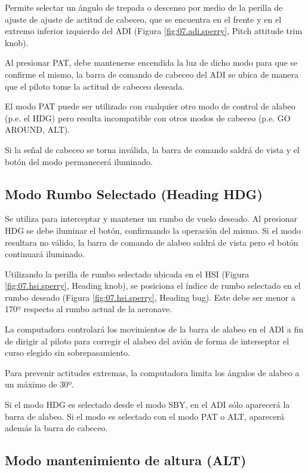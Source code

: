 Permite selectar un \'angulo de trepada o descenso por medio de la perilla
de ajuste de ajuste de actitud de cabeceo, que se encuentra en el frente y
en el extremo inferior izquierdo
del ADI (Figura \ref{fig:07.adi.sperry}, Pitch attitude trim knob).

Al presionar PAT, debe mantenerse encendida la luz de dicho modo
para que se confirme el mismo, la barra de comando de cabeceo del
ADI se ubica de manera que el piloto tome la actitud de cabeceo
deseada.

El modo PAT puede ser utilizado con cualquier otro modo de 
control de alabeo (p.e. el HDG) pero
resulta incompatible con otros modos de cabeceo (p.e. GO AROUND, ALT).

Si la se\~nal de cabeceo se torna inv\'alida, la barra de comando saldr\'a 
de vista y el bot\'on del modo permanecer\'a iluminado.

\subsection{Modo Rumbo Selectado (Heading HDG)}
\label{sec:hdg}

Se utiliza para interceptar y mantener un rumbo de vuelo deseado.
Al presionar HDG se debe iluminar el bot\'on, confirmando la
operaci\'on del mismo.
Si el modo resultara no v\'alido, la barra de comando de alabeo
saldr\'a de vista pero el bot\'on continuar\'a iluminado.

Utilizando la perilla de rumbo selectado ubicada en  el
HSI (Figura \ref{fig:07.hsi.sperry}, Heading knob),
se posiciona el \'indice de rumbo selectado en el rumbo
deseado 
(Figura \ref{fig:07.hsi.sperry}, Heading bug). 
Este debe ser menor a 170º respecto al rumbo actual de la aeronave.

La computadora controlar\'a los movimientos de la barra de
alabeo en el ADI a fin de dirigir al piloto para corregir
el alabeo del avi\'on de forma de interseptar el curso elegido
sin sobrepasamiento.

Para prevenir actitudes extremas, la computadora limita los \'angulos
de alabeo a un m\'aximo de 30º.

Si el modo HDG es selectado desde el modo SBY, en el ADI s\'olo
aparecer\'a la barra de alabeo. 
Si el modo es selectado con el modo PAT o ALT, aparecer\'a adem\'as
la barra de cabeceo.

\subsection{Modo mantenimiento de altura (ALT)}
\label{sec:alt}

